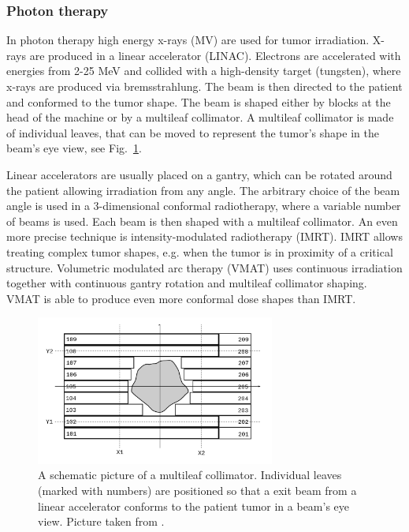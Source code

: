 \subsubsection{Photon therapy}

In photon therapy high energy x-rays (MV) are used for tumor irradiation. X-rays are produced in a linear accelerator (LINAC). Electrons are accelerated with energies from 2-25 MeV and collided with a high-density target (tungsten), where
x-rays are produced via bremsstrahlung. The beam is then directed to the patient and conformed to the tumor shape. The beam is shaped either by blocks at the head of the machine or by a multileaf collimator. A multileaf collimator is made of
individual leaves, that can be moved to represent the tumor's shape in the beam's eye view, see Fig.~\ref{MLC}.

Linear accelerators are usually placed on a gantry, which can be rotated around the patient allowing irradiation from any angle. 
The arbitrary choice of the beam angle is used in a 3-dimensional conformal radiotherapy, where a variable number of beams is used. 
Each beam is then shaped with a multileaf collimator. An even more precise technique is intensity-modulated radiotherapy (IMRT). IMRT allows treating complex tumor shapes, e.g. when the tumor is in proximity of a critical structure.
Volumetric modulated arc therapy (VMAT) uses continuous irradiation together with continuous gantry rotation and multileaf collimator shaping. VMAT is able to produce even more conformal dose shapes than IMRT.
\newpage
\begin{figure}[H]
\begin{center}
\includegraphics[width=0.7\textwidth]{./Fundamentals/Images/MLC.png}
\caption{A schematic picture of a multileaf collimator. Individual leaves (marked with numbers) are positioned so that a exit beam from a linear accelerator conforms to the patient tumor in a beam's eye view. Picture taken from \cite{MLC}.}
\label{MLC}
\end{center}
\end{figure}

